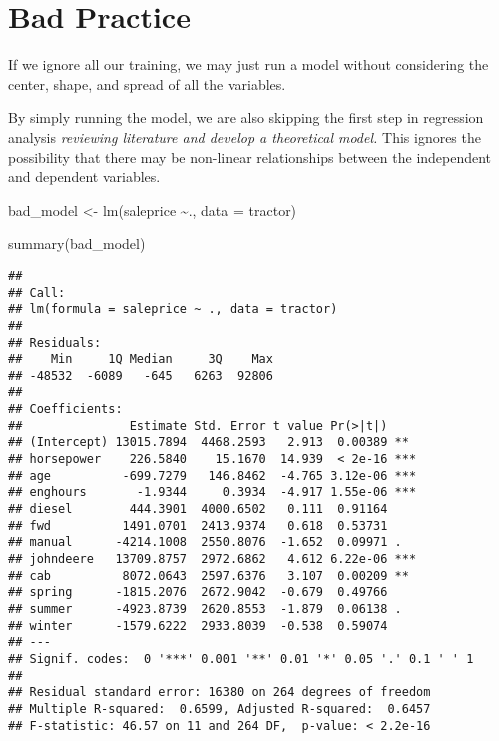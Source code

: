 \documentclass[
]{article}
\newenvironment{Shaded}{\begin{snugshade}}{\end{snugshade}}
\newcommand{\AttributeTok}[1]{\textcolor[rgb]{0.77,0.63,0.00}{#1}}
\newcommand{\FunctionTok}[1]{\textcolor[rgb]{0.00,0.00,0.00}{#1}}
\newcommand{\NormalTok}[1]{#1}
\newcommand{\OtherTok}[1]{\textcolor[rgb]{0.56,0.35,0.01}{#1}}
\newcommand{\SpecialCharTok}[1]{\textcolor[rgb]{0.00,0.00,0.00}{#1}}
\begin{document}
\hypertarget{bad-practice}{%
\section{Bad Practice}\label{bad-practice}}

If we ignore all our training, we may just run a model without
considering the center, shape, and spread of all the variables.

By simply running the model, we are also skipping the first step in
regression analysis \emph{reviewing literature and develop a theoretical
model.} This ignores the possibility that there may be non-linear
relationships between the independent and dependent variables.

\begin{Shaded}
\begin{Highlighting}[]
\NormalTok{bad\_model }\OtherTok{\textless{}{-}} \FunctionTok{lm}\NormalTok{(saleprice }\SpecialCharTok{\textasciitilde{}}\NormalTok{., }\AttributeTok{data =}\NormalTok{ tractor)}

\FunctionTok{summary}\NormalTok{(bad\_model)}
\end{Highlighting}
\end{Shaded}

\begin{verbatim}
## 
## Call:
## lm(formula = saleprice ~ ., data = tractor)
## 
## Residuals:
##    Min     1Q Median     3Q    Max 
## -48532  -6089   -645   6263  92806 
## 
## Coefficients:
##               Estimate Std. Error t value Pr(>|t|)    
## (Intercept) 13015.7894  4468.2593   2.913  0.00389 ** 
## horsepower    226.5840    15.1670  14.939  < 2e-16 ***
## age          -699.7279   146.8462  -4.765 3.12e-06 ***
## enghours       -1.9344     0.3934  -4.917 1.55e-06 ***
## diesel        444.3901  4000.6502   0.111  0.91164    
## fwd          1491.0701  2413.9374   0.618  0.53731    
## manual      -4214.1008  2550.8076  -1.652  0.09971 .  
## johndeere   13709.8757  2972.6862   4.612 6.22e-06 ***
## cab          8072.0643  2597.6376   3.107  0.00209 ** 
## spring      -1815.2076  2672.9042  -0.679  0.49766    
## summer      -4923.8739  2620.8553  -1.879  0.06138 .  
## winter      -1579.6222  2933.8039  -0.538  0.59074    
## ---
## Signif. codes:  0 '***' 0.001 '**' 0.01 '*' 0.05 '.' 0.1 ' ' 1
## 
## Residual standard error: 16380 on 264 degrees of freedom
## Multiple R-squared:  0.6599, Adjusted R-squared:  0.6457 
## F-statistic: 46.57 on 11 and 264 DF,  p-value: < 2.2e-16
\end{verbatim}
\end{document}
